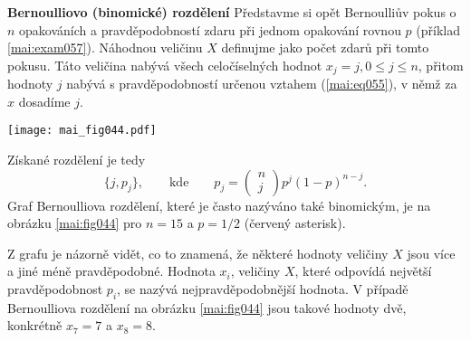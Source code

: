 \wikitextrule
\begin{example}\label{mai:exam065}
  \textbf{Bernoulliovo (binomické) rozdělení}\newline\small
  Představme si opět Bernoulliův pokus o \(n\) opakováních a pravděpodobností zdaru při jednom 
  opakování rovnou \(p\) (příklad \ref{mai:exam057}). Náhodnou veličinu \(X\) definujme jako počet 
  zdarů při tomto pokusu. Táto veličina nabývá všech celočíselných hodnot \(x_j = j, 0 \leq j \leq 
  n\), přitom hodnoty \(j\) nabývá s pravděpodobností určenou vztahem (\ref{mai:eq055}), v němž za 
  \(x\) dosadíme \(j\). 
  
  {\centering
   \captionsetup{type=figure}
   \texttt{[image: mai\_fig044.pdf]}
  \par}
  
  Získané rozdělení je tedy
  \begin{equation*}
    \lbrace j,p_j\rbrace, \qquad\text{kde}\qquad p_j = 
      \begin{pmatrix} n \\ j \end{pmatrix}p^j(1 - p)^{n-j}.
  \end{equation*}
  Graf Bernoulliova rozdělení, které je často nazýváno také binomickým, je na obrázku 
  \ref{mai:fig044} pro \(n = 15\) a \(p = 1/2\) (červený asterisk).
  
  Z grafu je názorně vidět, co to znamená, že některé hodnoty veličiny \(X\) jsou více a jiné méně 
  pravděpodobné. Hodnota \(x_i\), veličiny \(X\), které odpovídá největší pravděpodobnost \(p_i\), 
  se nazývá nejpravděpodobnější hodnota. V případě Bernoulliova rozdělení na obrázku 
  \ref{mai:fig044} jsou takové hodnoty dvě, konkrétně \(x_7 = 7\) a \(x_8 = 8\).
\normalsize
\end{example}


